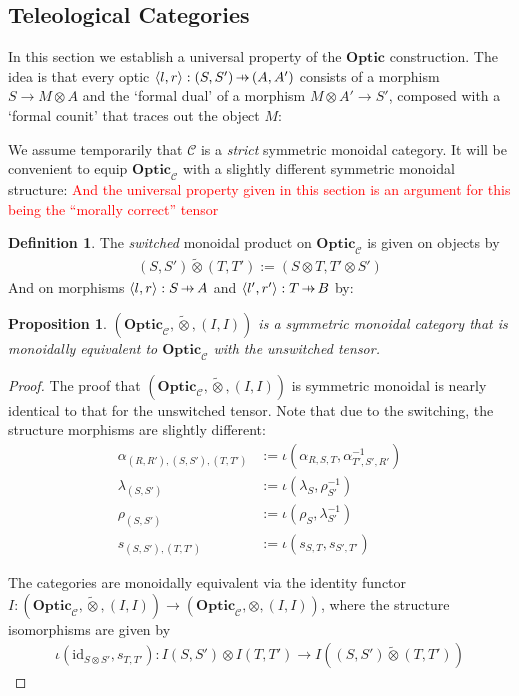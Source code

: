 \documentclass[11pt,a4paper]{article}
\theoremstyle{plain}
\newtheorem{proposition}[theorem]{Proposition}
\theoremstyle{definition}
\newtheorem{definition}[theorem]{Definition}
\newcommand{\C}{\mathscr{C}}
\newcommand{\Optic}{\mathbf{Optic}}
\newcommand{\switched}{\mathbin{\tilde{\otimes}}}
\newcommand{\id}{\mathrm{id}}
\newcommand{\hto}{\ensuremath{\,\mathaccent\shortmid\rightarrow\,}}
\newcommand{\todo}[1]{\textcolor{red}{\small #1}}
\begin{document}
\subsection{Teleological Categories}
\label{teleological-categories}

In this section we establish a universal property of the $\Optic$ construction. The idea is that every optic $\langle l, r\rangle : (S, S') \hto (A, A')$ consists of a morphism $S \to M \otimes A$ and the `formal dual' of a morphism $M \otimes A' \to S'$, composed with a `formal counit' that traces out the object $M$:
\begin{center}

\end{center}

We assume temporarily that $\C$ is a \emph{strict} symmetric monoidal category. It will be convenient to equip $\Optic_\C$ with a slightly different symmetric monoidal structure: \todo{And the universal property given in this section is an argument for this being the ``morally correct'' tensor}

\begin{definition}
The \emph{switched} monoidal product on $\Optic_\C$ is given on objects by 
\begin{align*}
(S, S') \switched (T, T') := (S \otimes T, T' \otimes S')
\end{align*}
And on morphisms $\langle l, r \rangle : S \hto A$ and $\langle l', r' \rangle : T \hto B$ by:
\begin{center}

\end{center}
\end{definition}

\begin{proposition}
$(\Optic_\C, \switched, (I, I))$ is a symmetric monoidal category that is monoidally equivalent to $\Optic_\C$ with the unswitched tensor.
\end{proposition}
\begin{proof}
The proof that $(\Optic_\C, \switched, (I, I))$ is symmetric monoidal is nearly identical to that for the unswitched tensor. Note that due to the switching, the structure morphisms are slightly different:
\begin{align*}
\alpha_{(R, R'), (S, S'), (T, T')} &:= \iota(\alpha_{R,S,T}, \alpha_{T',S',R'}^{-1}) \\
\lambda_{(S, S')} &:= \iota(\lambda_{S}, \rho_{S'}^{-1}) \\
\rho_{(S, S')} &:= \iota(\rho_{S}, \lambda_{S'}^{-1}) \\
s_{(S, S'), (T, T')} &:= \iota(s_{S, T}, s_{S', T'})
\end{align*}

The categories are monoidally equivalent via the identity functor $I : (\Optic_\C, \switched, (I, I)) \to (\Optic_\C, \otimes, (I, I))$, where the structure isomorphisms are given by
\begin{align*}
\iota(\id_{S \otimes S'}, s_{T, T'}) : I(S, S') \otimes I(T, T') \to I((S, S') \switched (T, T'))
\end{align*}

\end{proof}
\end{document}
